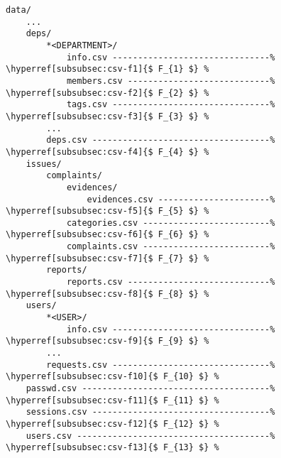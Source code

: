 \begin{lstlisting}[caption={ไฟล์ CSV ใน data/ Directory},numbers=none]
data/
    ...
    deps/
        *<DEPARTMENT>/
            info.csv -------------------------------% \hyperref[subsubsec:csv-f1]{$ F_{1} $} %
            members.csv ----------------------------% \hyperref[subsubsec:csv-f2]{$ F_{2} $} %
            tags.csv -------------------------------% \hyperref[subsubsec:csv-f3]{$ F_{3} $} %
        ...
        deps.csv -----------------------------------% \hyperref[subsubsec:csv-f4]{$ F_{4} $} %
    issues/
        complaints/
            evidences/
                evidences.csv ----------------------% \hyperref[subsubsec:csv-f5]{$ F_{5} $} %
            categories.csv -------------------------% \hyperref[subsubsec:csv-f6]{$ F_{6} $} %
            complaints.csv -------------------------% \hyperref[subsubsec:csv-f7]{$ F_{7} $} %
        reports/
            reports.csv ----------------------------% \hyperref[subsubsec:csv-f8]{$ F_{8} $} %
    users/
        *<USER>/
            info.csv -------------------------------% \hyperref[subsubsec:csv-f9]{$ F_{9} $} %
        ...
        requests.csv -------------------------------% \hyperref[subsubsec:csv-f10]{$ F_{10} $} %
    passwd.csv -------------------------------------% \hyperref[subsubsec:csv-f11]{$ F_{11} $} %
    sessions.csv -----------------------------------% \hyperref[subsubsec:csv-f12]{$ F_{12} $} %
    users.csv --------------------------------------% \hyperref[subsubsec:csv-f13]{$ F_{13} $} %
\end{lstlisting}


